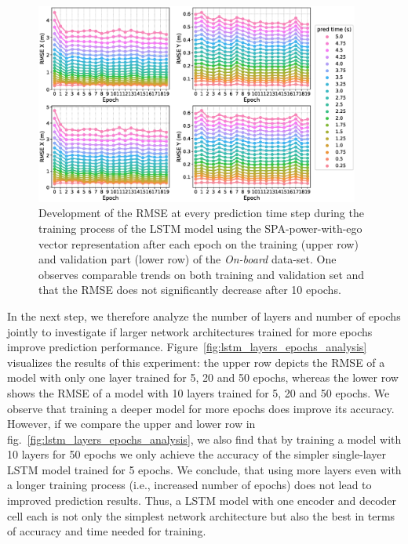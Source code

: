 \begin{figure}[t!]
  \centering
  \includegraphics[width=0.95\textwidth]{imgs/rmse_dev_over_epochs.eps}
  \caption{Development of the \ac{RMSE} at every prediction time step during the training process of the \ac{LSTM} model using the \ac{SPA}-power-with-ego vector representation after each epoch on the training (upper row) and validation part (lower row) of the \emph{On-board} data-set. One observes comparable trends on both training and validation set and that the \ac{RMSE} does not significantly decrease after \num{10} epochs.}\label{fig:rmse_dev_over_epochs}
\end{figure}

In the next step, we therefore analyze the number of layers and number of epochs jointly to investigate if larger network architectures trained for more epochs improve prediction performance.
Figure~\ref{fig:lstm_layers_epochs_analysis} visualizes the results of this experiment: the upper row depicts the \ac{RMSE} of a model with only one layer trained for \num{5}, \num{20} and \num{50} epochs, whereas the lower row shows the \ac{RMSE} of a model with \num{10} layers trained for \num{5}, \num{20} and \num{50} epochs. 
We observe that training a deeper model for more epochs does improve its accuracy.
However, if we compare the upper and lower row in fig.~\ref{fig:lstm_layers_epochs_analysis}, we also find that by training a model with \num{10} layers for \num{50} epochs we only achieve the accuracy of the simpler single-layer \ac{LSTM} model trained for \num{5} epochs.
We conclude, that using more layers even with a longer training process (i.e., increased number of epochs) does not lead to improved prediction results.
Thus, a \ac{LSTM} model with one encoder and decoder cell each is not only the simplest network architecture but also the best in terms of accuracy and time needed for training.

